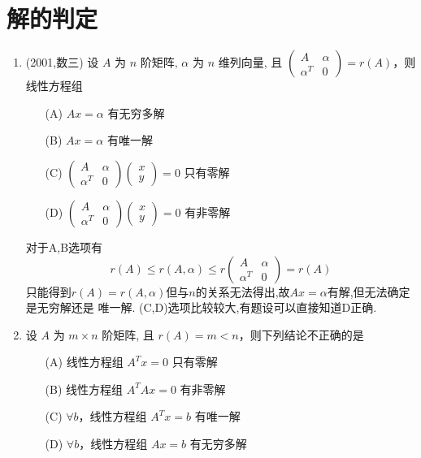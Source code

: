 \documentclass[12pt, a4paper, oneside, UTF8]{ctexbook}
\begin{document}
\section{解的判定}
\begin{enumerate}
    \item (2001,数三) 设 $A$ 为 $n$ 阶矩阵, $\alpha$ 为 $n$ 维列向量, 且 $\begin{pmatrix} A & \alpha \\ \alpha^T & 0 \end{pmatrix} = r(A)$，则线性方程组
    \begin{enumerate}
        \item [(A)] $Ax = \alpha$ 有无穷多解
        \item [(B)] $Ax = \alpha$ 有唯一解
        \item [(C)] $\begin{pmatrix} A & \alpha \\ \alpha^T & 0 \end{pmatrix} \begin{pmatrix} x \\ y \end{pmatrix} = 0$ 只有零解
        \item [(D)] $\begin{pmatrix} A & \alpha \\ \alpha^T & 0 \end{pmatrix} \begin{pmatrix} x \\ y \end{pmatrix} = 0$ 有非零解
    \end{enumerate}
    
    \begin{solution}
    对于A,B选项有 
    $$
    r(A)\leq r(A,\alpha) \leq r\begin{pmatrix}
        A &\alpha \\
        \alpha^T & 0 
    \end{pmatrix} = r(A)
    $$ 只能得到$r(A)=r(A,\alpha)$但与$n$的关系无法得出,故$Ax=\alpha$有解,但无法确定是无穷解还是
    唯一解. (C,D)选项比较较大,有题设可以直接知道D正确. 
    \end{solution}
    
    \item 设 $A$ 为 $m \times n$ 阶矩阵, 且 $r(A) = m < n$，则下列结论不正确的是
    \begin{enumerate}
        \item [(A)] 线性方程组 $A^T x = 0$ 只有零解
        \item [(B)] 线性方程组 $A^T A x = 0$ 有非零解
        \item [(C)] $\forall b$，线性方程组 $A^T x = b$ 有唯一解
        \item [(D)] $\forall b$，线性方程组 $A x = b$ 有无穷多解
    \end{enumerate}
    

\end{enumerate}
\end{document}
